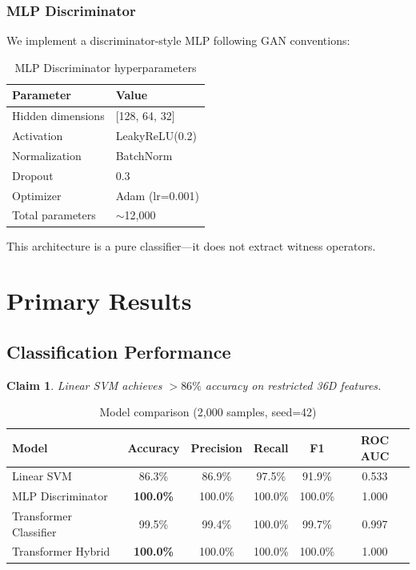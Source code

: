 \documentclass[11pt,a4paper]{article}
\newtheorem{claim}{Claim}
\begin{document}
\subsubsection{MLP Discriminator}

We implement a discriminator-style MLP following GAN conventions:

\begin{table}[h]
\centering
\caption{MLP Discriminator hyperparameters}
\begin{tabular}{ll}
\toprule
\textbf{Parameter} & \textbf{Value} \\
\midrule
Hidden dimensions & [128, 64, 32] \\
Activation & LeakyReLU(0.2) \\
Normalization & BatchNorm \\
Dropout & 0.3 \\
Optimizer & Adam (lr=0.001) \\
Total parameters & $\sim$12,000 \\
\bottomrule
\end{tabular}
\end{table}

This architecture is a pure classifier---it does not extract witness operators.

\section{Primary Results}

\subsection{Classification Performance}

\begin{claim}
Linear SVM achieves $>86\%$ accuracy on restricted 36D features.
\end{claim}

\begin{table}[h]
\centering
\caption{Model comparison (2,000 samples, seed=42)}
\begin{tabular}{lccccc}
\toprule
\textbf{Model} & \textbf{Accuracy} & \textbf{Precision} & \textbf{Recall} & \textbf{F1} & \textbf{ROC AUC} \\
\midrule
Linear SVM & 86.3\% & 86.9\% & 97.5\% & 91.9\% & 0.533 \\
MLP Discriminator & \textbf{100.0\%} & 100.0\% & 100.0\% & 100.0\% & 1.000 \\
Transformer Classifier & 99.5\% & 99.4\% & 100.0\% & 99.7\% & 0.997 \\
Transformer Hybrid & \textbf{100.0\%} & 100.0\% & 100.0\% & 100.0\% & 1.000 \\
\bottomrule
\end{tabular}
\end{table}
\end{document}
